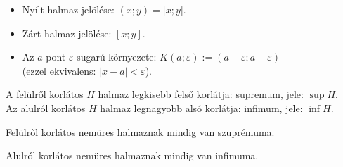 
\begin{blueBox}
  \begin{itemize}
    \item Nyílt halmaz jelölése: $(x; y) = ]x; y[$.
    \item Zárt halmaz jelölése: $[x; y]$.
    \item Az $a$ pont $\varepsilon$ sugarú környezete: $K(a; \varepsilon) := (a
          - \varepsilon; a + \varepsilon)$ \\ (ezzel ekvivalens: $|x-a| <
          \varepsilon$).
  \end{itemize}

  \begin{center}
  \end{center}
\end{blueBox}

\begin{definition}
  A felülről korlátos $H$ halmaz legkisebb felső korlátja: supremum, jele: $\sup
    H$.
  \\
  Az alulról korlátos $H$ halmaz legnagyobb alsó korlátja: infimum, jele: $\inf
    H$.
\end{definition}

\begin{theorem}
  Felülről korlátos nemüres halmaznak mindig van szuprémuma.
\end{theorem}

\begin{theorem}
  Alulról korlátos nemüres halmaznak mindig van infimuma.
\end{theorem}
